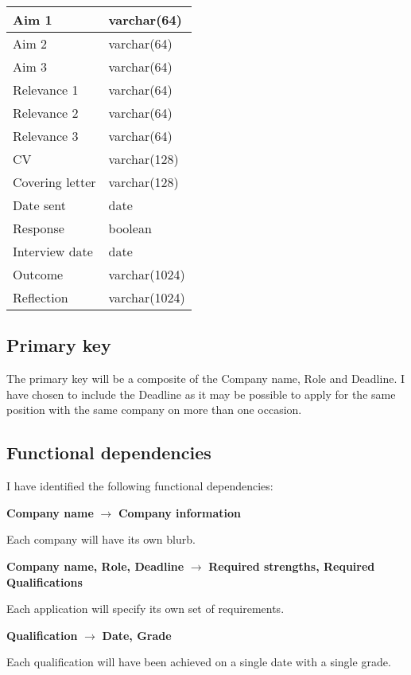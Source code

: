 \documentclass[a4paper, twoside]{article}
\begin{document}
\begin{center}
\begin{tabular}{|l|l|}
Aim 1 & varchar(64) \\ \hline
Aim 2 & varchar(64) \\ \hline
Aim 3 & varchar(64) \\ \hline
Relevance 1 & varchar(64) \\ \hline
Relevance 2 & varchar(64) \\ \hline
Relevance 3 & varchar(64) \\ \hline
CV & varchar(128) \\ \hline
Covering letter & varchar(128) \\ \hline
Date sent & date \\ \hline
Response & boolean \\ \hline
Interview date & date \\ \hline
Outcome & varchar(1024) \\ \hline
Reflection & varchar(1024) \\
\hline
\end{tabular}
\end{center}

\subsection{Primary key}
The primary key will be a composite of the Company name, Role and Deadline. I
have chosen to include the Deadline as it may be possible to apply for the same
position with the same company on more than one occasion.

\newpage
\subsection{Functional dependencies}
I have identified the following functional dependencies:

\begin{center}
  \textbf{Company name} $\rightarrow$ \textbf{Company information}
\end{center}
Each company will have its own blurb.

\begin{center}
  \textbf{Company name, Role, Deadline} $\rightarrow$ \textbf{Required strengths, Required
  Qualifications}
\end{center}
Each application will specify its own set of requirements.

\begin{center}
  \textbf{Qualification} $\rightarrow$ \textbf{Date, Grade}
\end{center}
Each qualification will have been achieved on a single date with a single grade.
\end{document}
